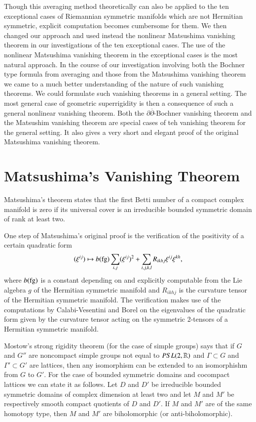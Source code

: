 Though this averaging method theoretically can also be applied to the ten exceptional cases of Riemannian symmetric manifolds which are not Hermitian symmetric, explicit computation becomes cumbersome for them. We then changed our approach and used instead the nonlinear Matsushima vanishing theorem in our investigations of the ten exceptional cases. The use of the nonlinear Matsushima vanishing theorem in the exceptional cases is the most natural approach. In the course of our investigation involving both the Bochner type formula from averaging and those from the Matsushima vanishing theorem we came to a much better understanding of the nature of such vanishing theorems. We could formulate such vanishing theorems in a general setting. The most general case of geometric superrigidity is then a consequence of such a general nonlinear vanishing theorem. Both the $\partial \overline{\partial}$-Bochner vanishing theorem and the Matsushim vanishing theorem are special cases of teh vanishing theorem for the general setting. It also gives a very short and elegant proof of the original Matsushima vanishing theorem.

\section*{Matsushima's Vanishing Theorem}
\pageoriginale

Matsushima's theorem states that the first Betti number of a compact complex manifold is zero if its universal cover is an irreducible bounded symmetric domain of rank at least two.

One step of Matsushima's original proof is the verification of the positivity of a certain quadratic form
$$
(\xi^{ij}) \mapsto b(\operatorname{fg}) \sum\limits_{i,j}(\xi^{ij})^{2} + \sum\limits_{i,j,k,l} R_{ikhj}\xi^{ij}\xi^{kh},
$$
where $b(\operatorname{fg})$ is a constant depending on and explicitly computable from  the Lie algebra $g$ of the Hermitian symmetric manifold and $R_{ikhj}$ is the curvature tensor of the Hermitian symmetric manifold. The verification makes use of the computations by Calabi-Vesentini and Borel on the eigenvalues of the quadratic form given by the curvature tensor acting on the symmetric 2-tensors of a Hermitian symmetric manifold.

Mostow's strong rigidity theorem (for the case of simple groups) says that if $G$ and $G''$ are noncompact simple groups not equal to $PSL\break (2, \bbR)$ and $\Gamma \subset G$ and $\Gamma' \subset G'$ are lattices, then any isomorphism can be extended to an isomorphishm from $G$ to $G'$. For the case of bounded symmetric domains and cocompact lattices we can state it as follows. Let $D$ and $D'$ be irreducible bounded symmetric domains of complex dimension at least two and let $M$ and $M'$ be respectively smooth compact quotients of $D$ and $D'$. If $M$ and $M'$ are of the same homotopy type, then $M$ and $M'$ are biholomorphic (or anti-biholomorphic).

